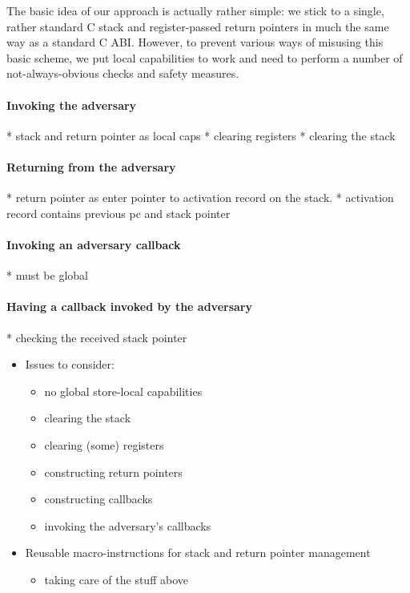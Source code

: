 \documentclass[compsoc,conference,letterpaper,fleqn]{IEEEtran}
\begin{document}
The basic idea of our approach is actually rather simple: we stick to a single,
rather standard C stack and register-passed return pointers in much the same way
as a standard C ABI. However, to prevent various ways of misusing this basic
scheme, we put local capabilities to work and need to perform a number of
not-always-obvious checks and safety measures.

\paragraph{Invoking the adversary}
* stack and return pointer as local caps
* clearing registers
* clearing the stack

\paragraph{Returning from the adversary}
* return pointer as enter pointer to activation record on the stack.
* activation record contains previous pc and stack pointer

\paragraph{Invoking an adversary callback}
* must be global

\paragraph{Having a callback invoked by the adversary}
* checking the received stack pointer




\begin{itemize}
\item Issues to consider:
\begin{itemize}
\item no global store-local capabilities
\item clearing the stack
\item clearing (some) registers
\item constructing return pointers
\item constructing callbacks
\item invoking the adversary's callbacks
\end{itemize}
\item Reusable macro-instructions for stack and return pointer management
\begin{itemize}
\item taking care of the stuff above
\end{itemize}
\end{itemize}
\end{document}
